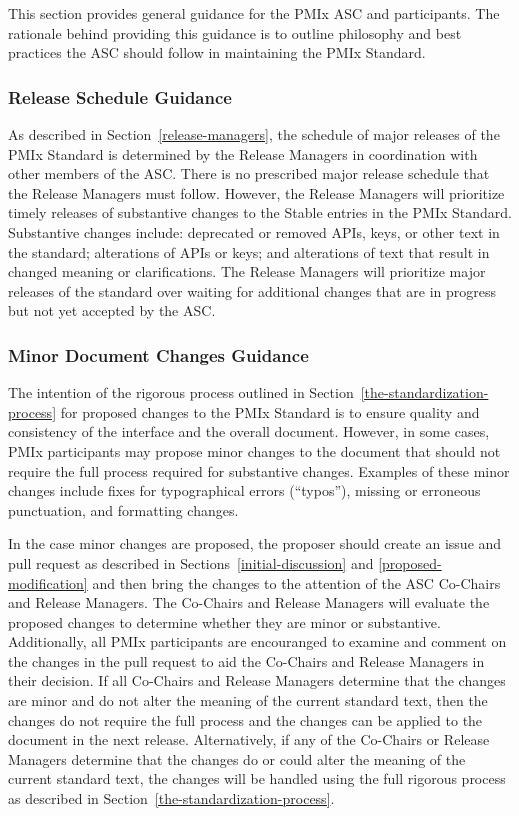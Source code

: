 \documentclass{article}
\begin{document}
This section provides general guidance for the PMIx ASC and participants.
The rationale behind providing this guidance is to outline
philosophy and best practices the ASC should follow in 
maintaining the PMIx Standard. 

\hypertarget{release-schedule-guidance}{%
\subsubsection{Release Schedule Guidance}\label{release-schedule-guidance}}

As described in Section~\ref{release-managers},
the schedule of major releases of the PMIx
Standard is determined by the Release Managers in coordination with other
members of the ASC. There is no prescribed major release schedule that the
Release Managers must follow. However, the Release Managers will prioritize
timely releases of substantive changes to the Stable entries in the 
PMIx Standard. Substantive changes
include: deprecated or removed
APIs, keys, or other text in the standard; alterations of APIs or keys; and
alterations of text that result in changed meaning or clarifications. The
Release Managers will prioritize major releases of the standard over waiting for
additional changes that are in progress but not yet accepted by the ASC.

\hypertarget{administrative-changes-guidance}{%
\subsubsection{Minor Document Changes Guidance}\label{administrative-changes-guidance}}
The intention of the rigorous process outlined in 
Section~\ref{the-standardization-process} for proposed
changes to the PMIx Standard is to ensure quality and consistency of 
the interface and the overall document. However, in some cases, 
PMIx participants may propose minor changes to the document that 
should not require the full process required for substantive changes. 
Examples of these minor changes include fixes for typographical errors 
(``typos''), missing or erroneous punctuation, and formatting changes.

In the case minor changes are proposed, the proposer should 
create an issue and pull request as described in Sections~\ref{initial-discussion}
and \ref{proposed-modification} and then bring the
changes to the attention of the ASC Co-Chairs and Release Managers.
The Co-Chairs and Release Managers will evaluate the proposed
changes to determine whether they are minor or substantive.
Additionally, all PMIx participants are encouranged to examine
and comment on the changes in the pull request to aid the
Co-Chairs and Release Managers in their decision.
If all Co-Chairs and Release Managers determine that the
changes are minor and do not alter the meaning of the current standard text, 
then the changes do not require the full process and
the changes can be applied to the document in the next release.
Alternatively, if any of the Co-Chairs or Release Managers determine 
that the changes do or could alter the meaning of the current standard text, 
the changes will be handled using the full rigorous process
as described in Section~\ref{the-standardization-process}.
\end{document}
